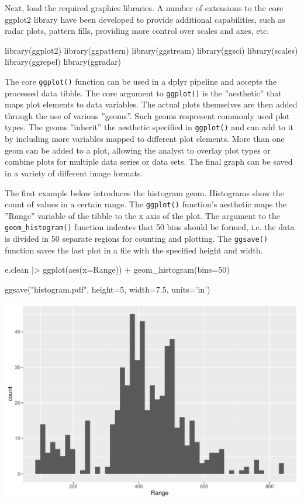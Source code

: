 \noindent Next, load the required graphics libraries. A number of extensions to the core ggplot2 library have been developed to provide additional capabilities, such as radar plots, pattern fills, providing more control over scales and axes, etc.

\begin{samepage}
\begin{Rcode}
library(ggplot2)
library(ggpattern)
library(ggstream)
library(ggsci)
library(scales)
library(ggrepel)
library(ggradar)
\end{Rcode}
\end{samepage}

The core \texttt{ggplot()} function can be used in a dplyr pipeline and accepts the processed data tibble. The core argument to \texttt{ggplot()} is the ''aesthetic'' that maps plot elements to data variables. The actual plots themselves are then added through the use of various ''geoms''. Such geoms respresent commonly used plot types. The geoms ''inherit'' the aesthetic specified in \texttt{ggplot()} and can add to it by including more variables mapped to different plot elements. More than one geom can be added to a plot, allowing the analyst to overlay plot types or combine plots for multiple data series or data sets. The final graph can be saved in a variety of different image formats.

The first example below introduces the histogram geom. Histograms show the count of values in a certain range. The \texttt{ggplot()} function's aesthetic maps the ''Range'' variable of the tibble to the x axis of the plot. The argument to the \texttt{geom\_histogram()} function indcates that 50 bins should be formed, i.e. the data is divided in 50 separate regions for counting and plotting. The \texttt{ggsave()} function saves the last plot in a file with the specified height and width.

\begin{samepage}
\begin{Rcode}
e.clean |>
  ggplot(aes(x=Range)) + 
    geom_histogram(bins=50)
    
ggsave("histogram.pdf", 
       height=5, width=7.5, units='in')
\end{Rcode}
\end{samepage}

\begin{center}
\includegraphics[width=.8\textwidth]{histogram.pdf}
\end{center}

